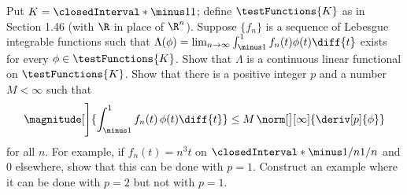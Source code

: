 % 
% 
\begin{exerciseStatement}
Put $K=\closedInterval*{\minus 1}{1}$; define $\testFunctions{K}$ as in Section 1.46 (with $\R$ in place of $\R^n$). %
Suppose $\{f_{n}\}$ is a sequence of Lebesgue integrable functions such that %
$\Lambda(\phi) = \lim_{n \to \infty} \int_{\minus 1}^1 f_{n}(t)\phi(t) \diff{t}$ exists for every %
$\phi\in\testFunctions{K}$. Show that $\Lambda$ is a continuous linear functional on $\testFunctions{K}$. %
Show that there is a positive integer $p$ and a number $M<\infty$ such that
% 
\begin{equation}
  \magnitude[\Bigg]{\int_{\minus 1}^1 f_n (t)\, \phi (t) \diff{t}}\leq M \, \norm[\big][\infty]{\deriv[p]{\phi}}
\end{equation}
% 
for all $n$. For example, if $f_{n}(t)=n^{3}t$ on $\closedInterval*{\minus 1/n}{1/n}$ and $0$ elsewhere, show that this %
can be done with $p=1$. Construct an example where it can be done with $p=2$ but not with $p=1$.
\end{exerciseStatement}
% 
